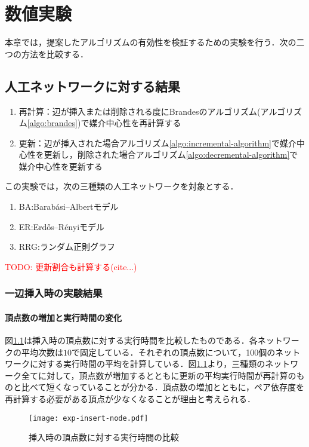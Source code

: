 \chapter{数値実験}

本章では，提案したアルゴリズムの有効性を検証するための実験を行う．次の二つの方法を比較する．

\section{人工ネットワークに対する結果}

\begin{enumerate}
\item 再計算：辺が挿入または削除される度にBrandesのアルゴリズム(アルゴリズム\ref{algo:brandes})で媒介中心性を再計算する
\item 更新：辺が挿入された場合アルゴリズム\ref{algo:incremental-algorithm}で媒介中心性を更新し，削除された場合アルゴリズム\ref{algo:decremental-algorithm}で媒介中心性を更新する
\end{enumerate}

この実験では，次の三種類の人工ネットワークを対象とする．
\begin{enumerate}
\item BA:Barab\'{a}si--Albertモデル
\item ER:Erd\H{o}s--R\'{e}nyiモデル
\item RRG:ランダム正則グラフ
\end{enumerate}

\textcolor{red}{TODO: 更新割合も計算する(cite...)}

\subsection{一辺挿入時の実験結果}

\subsubsection{頂点数の増加と実行時間の変化}
図\ref{fig:exp-insert-node}は挿入時の頂点数に対する実行時間を比較したものである．各ネットワークの平均次数は$10$で固定している．それぞれの頂点数について，100個のネットワークに対する実行時間の平均を計算している．図\ref{fig:exp-insert-node}より，三種類のネットワーク全てに対して，頂点数が増加するとともに更新の平均実行時間が再計算のものと比べて短くなっていることが分かる．頂点数の増加とともに，ペア依存度を再計算する必要がある頂点が少なくなることが理由と考えられる．

\begin{figure}[tb]
  \centering
  \texttt{[image: exp-insert-node.pdf]}
  \caption{挿入時の頂点数に対する実行時間の比較}
  \label{fig:exp-insert-node}
\end{figure}

